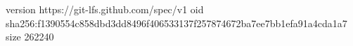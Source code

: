 version https://git-lfs.github.com/spec/v1
oid sha256:f1390554c858dbd3dd8496f406533137f257874672ba7ee7bb1efa91a4cda1a7
size 262240
